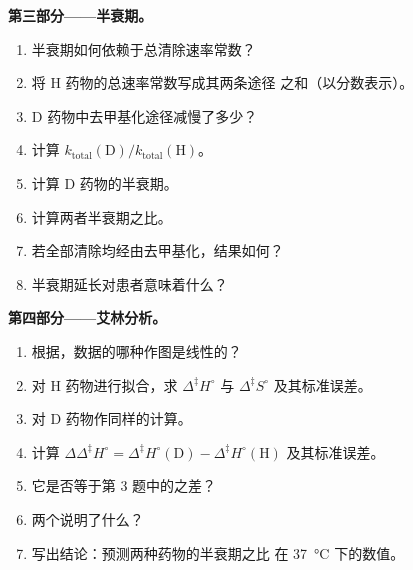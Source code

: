 \begin{problem}
\medskip\noindent\textbf{第三部分——半衰期。}
\begin{enumerate}[resume]
  \item 半衰期如何依赖于总清除速率常数？
  \item 将 H 药物的总速率常数写成其两条途径
        之和（以分数表示）。
  \item D 药物中去甲基化途径减慢了多少？
  \item 计算 $k_{\mathrm{total}}(\mathrm D)/k_{\mathrm{total}}(\mathrm H)$。
  \item 计算 D 药物的半衰期。
  \item 计算两者半衰期之比。
  \item 若全部清除均经由去甲基化，结果如何？
  \item 半衰期延长对患者意味着什么？
\end{enumerate}

\medskip\noindent\textbf{第四部分——艾林分析。}
\begin{enumerate}[resume]
  \item 根据，数据的哪种作图是线性的？
  \item 对 H 药物进行拟合，求 $\Delta^{\ddagger}H^\circ$ 与 $\Delta^{\ddagger}S^\circ$ 及其标准误差。
  \item 对 D 药物作同样的计算。
  \item 计算 $\Delta\Delta^{\ddagger}H^\circ = \Delta^{\ddagger}H^\circ(\mathrm D) - \Delta^{\ddagger}H^\circ(\mathrm H)$ 及其标准误差。
  \item 它是否等于第 3 题中的之差？
  \item 两个说明了什么？
  \item 写出结论：预测两种药物的半衰期之比
        在 \qty{37}{\celsius} 下的数值。
\end{enumerate}
\end{problem}
